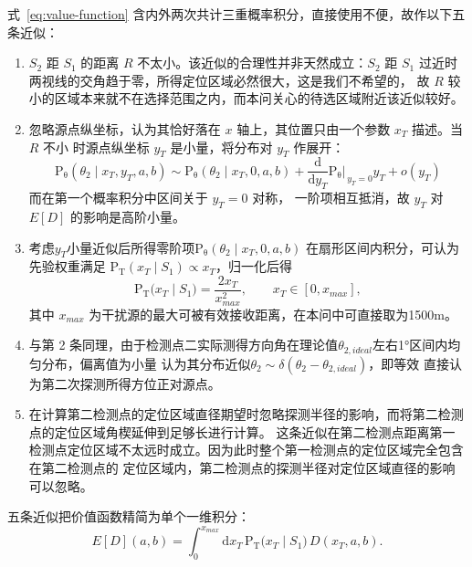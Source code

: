 式~\eqref{eq:value-function} 含内外两次共计三重概率积分，直接使用不便，故作以下五条近似：

\begin{enumerate}
    \item $S_2$ 距 $S_1$ 的距离 $R$ 不太小。该近似的合理性并非天然成立：$S_2$ 距
          $S_1$ 过近时两视线的交角趋于零，所得定位区域必然很大，这是我们不希望的，
          故 $R$ 较小的区域本来就不在选择范围之内，而本问关心的待选区域附近该近似较好。
    \item 忽略源点纵坐标，认为其恰好落在 $x$ 轴上，其位置只由一个参数 $x_T$ 描述。当 $R$ 不小
          时源点纵坐标 $y_T$ 是小量，将分布对 $y_T$ 作展开：
          \begin{equation}
          \mathrm{P_{\theta}}(\theta_2\mid x_T,y_T,a,b)
          \sim\mathrm{P_{\theta}}(\theta_2\mid x_T,0,a,b)
          +\frac{\mathrm{d}}{\mathrm{d}y_T}\mathrm{P_{\theta}}
          \big|_{\,y_T=0}y_T+o(y_T)
          \end{equation}
          而在第一个概率积分中区间关于 $y_T=0$ 对称，
          一阶项相互抵消，故 $y_T$ 对 $E[D]$ 的影响是高阶小量。
    \item 考虑$y_T$小量近似后所得零阶项$\mathrm{P_{\theta}}(\theta_2\mid x_T,0,a,b)$
        在扇形区间内积分，可认为先验权重满足
          $\mathrm{P_T}(x_T\mid S_1)\propto x_T$，归一化后得
          \begin{equation}
              \mathrm{P_T}\bigl(x_T\mid S_1\bigr)=\frac{2x_T}{x_{max}^2},
              \qquad x_T\in[0,x_{max}],
              \label{eq:pt-x}
          \end{equation}
          其中 $x_{max}$ 为干扰源的最大可被有效接收距离，在本问中可直接取为1500m。
    \item 与第 2 条同理，由于检测点二实际测得方向角在理论值$\theta_{2,ideal}$左右1°区间内均匀分布，偏离值为小量
        认为其分布近似$\theta_2 \sim \delta(\theta_2 - \theta_{2,ideal})$，即等效
          直接认为第二次探测所得方位{\heiti 正对源点}\songti。
    \item 在计算第二检测点的定位区域直径期望时忽略探测半径的影响，而将第二检测点的定位区域角楔延伸到足够长进行计算。
          这条近似在第二检测点距离第一检测点定位区域不太远时成立。因为此时整个第一检测点的定位区域完全包含在第二检测点的
            定位区域内，第二检测点的探测半径对定位区域直径的影响可以忽略。
\end{enumerate}

五条近似把价值函数精简为单个一维积分：
\begin{equation}
    E[D](a,b)=\int_0^{x_{max}}\mathrm{d}x_T\,
    \mathrm{P_T}\bigl(x_T\mid S_1\bigr)\,D(x_T,a,b).
    \label{eq:value-1d}
\end{equation}

